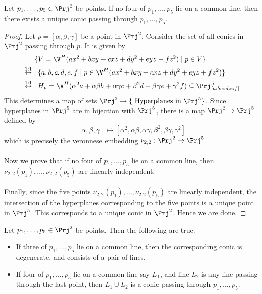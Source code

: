 \documentclass[a4paper]{article}
\begin{document}
\begin{prp}{}{} Let $p_1,\dots,p_5\in\Prj^2$ be points. If no four of $p_1,\dots,p_5$ lie on a common line, then there exists a unique conic passing through $p_1,\dots,p_5$. 
\begin{proof}
Let $p=[\alpha,\beta,\gamma]$ be a point in $\Prj^2$. Consider the set of all conics in $\Prj^2$ passing through $p$. It is given by 
\begin{align*}
&\;\;\;\;\;\;\{V=\V^H(ax^2+bxy+cxz+dy^2+eyz+fz^2)\;|\;p\in V\}\\
&\overset{1:1}{\leftrightarrow}\;\;\{a,b,c,d,e,f\;|\;p\in\V^H(ax^2+bxy+cxz+dy^2+eyz+fz^2)\}\\
&\overset{1:1}{\leftrightarrow}\;\;H_p=\V^H(\alpha^2a+\alpha\beta b+\alpha\gamma c+\beta^2d+\beta\gamma e+\gamma^2f)\subseteq\Prj_{[a:b:c:d:e:f]}^5
\end{align*}
This determines a map of sets $\Prj^2\to\{\text{ Hyperplanes in }\Prj^5\}$. Since hyperplanes in $\Prj^5$ are in bijection with $\Prj^5$, there is a map $\Prj^2\to\Prj^5$ defined by $$[\alpha,\beta,\gamma]\mapsto[\alpha^2,\alpha\beta,\alpha\gamma,\beta^2,\beta\gamma,\gamma^2]$$ which is precisely the veronnese embedding $\nu_{2,2}:\Prj^2\to\Prj^5$. \\~\\

Now we prove that if no four of $p_1,\dots,p_5$ lie on a common line, then $\nu_{2,2}(p_1),\dots,\nu_{2,2}(p_5)$ are linearly independent. \\~\\

Finally, since the five points $\nu_{2,2}(p_1),\dots,\nu_{2,2}(p_5)$ are linearly independent, the intersection of the hyperplanes corresponding to the five points is a unique point in $\Prj^5$. This corresponds to a unique conic in $\Prj^2$. Hence we are done. 
\end{proof}
\end{prp}

\begin{prp}{}{} Let $p_1,\dots,p_5\in\Prj^2$ be points. Then the following are true. 
\begin{itemize}
\item If three of $p_1,\dots,p_5$ lie on a common line, then the corresponding conic is degenerate, and consists of a pair of lines. 
\item If four of $p_1,\dots,p_5$ lie on a common line say $L_1$, and line $L_2$ is any line passing through the last point, then $L_1\cup L_2$ is a conic passing through $p_1,\dots,p_5$. 
\end{itemize}
\end{prp}
\end{document}
